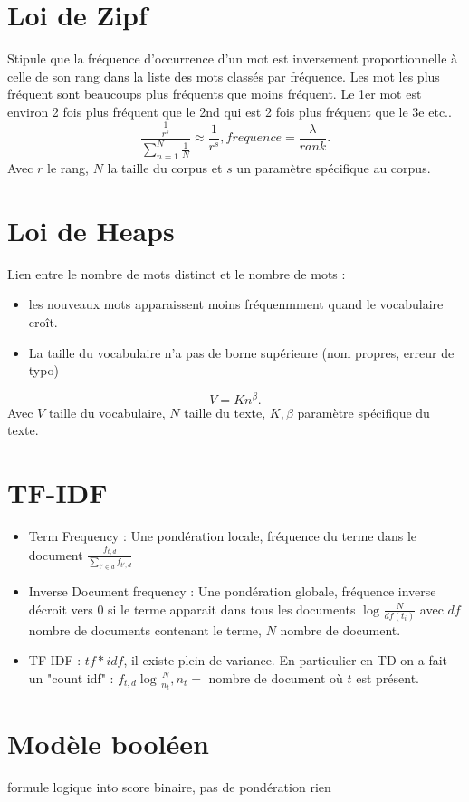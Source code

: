 \documentclass{article}
\theoremstyle{plain}%
\theoremstyle{definition}
\theoremstyle{remark}
\begin{document}
\section{Loi de Zipf}
Stipule que la fréquence d'occurrence d'un mot est inversement proportionnelle à celle de son rang dans la liste des mots classés par fréquence. Les mot les plus fréquent sont beaucoups plus fréquents que moins fréquent. Le 1er mot est environ 2 fois plus fréquent que le 2nd qui est 2 fois plus fréquent que le 3e etc.. 
\[
    \frac{ \frac{1 }{r^s}}{ \sum_{n=1}^{N} \frac{1}{N}} \approx \frac{1}{r^s}, frequence = \frac{\lambda }{rank}
.\]
Avec $ r $ le rang, $ N $ la taille du corpus et $ s $ un paramètre spécifique au corpus.

\section{Loi de Heaps}
Lien entre le nombre de mots distinct et le nombre de mots : \begin{itemize}
    \item les nouveaux mots apparaissent moins fréquenmment quand le vocabulaire croît. 
    \item La taille du vocabulaire n'a pas de borne supérieure (nom propres, erreur de typo)
\end{itemize} 
\[
    V = K n ^\beta 
.\]
Avec $ V $ taille du vocabulaire, $ N $ taille du texte, $ K, \beta  $ paramètre spécifique du texte.

\section{TF-IDF}
\begin{itemize}
    \item Term Frequency : Une pondération locale, fréquence du terme dans le document $ \frac{f_{t,d}}{\sum_{t' \in d}^{} f_{t', d}} $ 
    \item Inverse Document frequency : Une pondération globale, fréquence inverse décroit vers 0 si le terme apparait dans tous les documents $ \log_{} \frac{N}{df(t_i)} $ avec $ df $ nombre de documents contenant le terme, $ N $ nombre de document. 
    \item TF-IDF : $ tf * idf $, il existe plein de variance. En particulier en TD on a fait un "count idf" : $ f_{t,d} \log_{} \frac{N}{n_t}, n_t = $ nombre de document où $ t $ est présent.
\end{itemize}


\section{Modèle booléen}
formule logique into score binaire, pas de pondération rien
\end{document}
